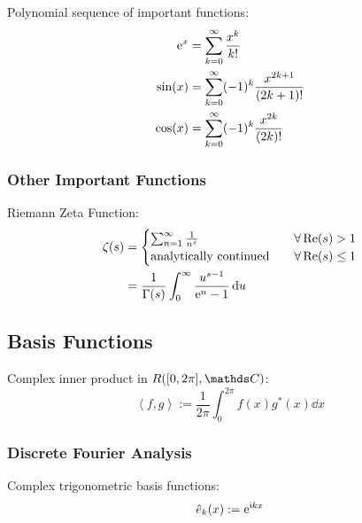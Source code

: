 			\noindent
			Polynomial sequence of important functions:
			\begin{equation}
				\begin{aligned}
					\mathrm{e}^x &= \sum_{k=0}^{\infty}{\frac{x^k}{k!}} \\
					\sin(x) &= \sum_{k=0}^\infty (-1)^k \frac{x^{2k+1}}{(2k+1)!} \\
					\cos(x) &= \sum_{k=0}^\infty (-1)^k \frac{x^{2k}}{(2k)!} \\
				\end{aligned}
			\end{equation}

		\subsubsection{Other Important Functions}
			Riemann Zeta Function:
			\begin{equation}
				\begin{aligned}
					\zeta(s) &= \begin{cases}
						\sum_{n=1}^{\infty} \frac{1}{n^s} \quad &\forall \Re(s) > 1\\
						\text{analytically continued} \quad &\forall \Re(s) \le 1\\
					\end{cases} \\
					&= \frac{1}{\Gamma(s)}\int_{0}^{\infty} \frac{u^{s-1}}{\mathrm{e}^u-1} \dd{u} \\
				\end{aligned}
			\end{equation}

	\subsection{Basis Functions}
		\noindent
		Complex inner product in $R([0,2\pi],\complex )$:
		\begin{equation}
			\left<f,g\right>:=\frac{1}{2\pi}\int_0^{2\pi} f(x)g^* (x)\dd{x}
		\end{equation}

		\subsubsection{Discrete Fourier Analysis}
			\noindent
			Complex trigonometric basis functions:
			\begin{equation}
				\hat{e}_k(x):=\mathrm{e}^{\mathrm{i} kx}
			\end{equation}

